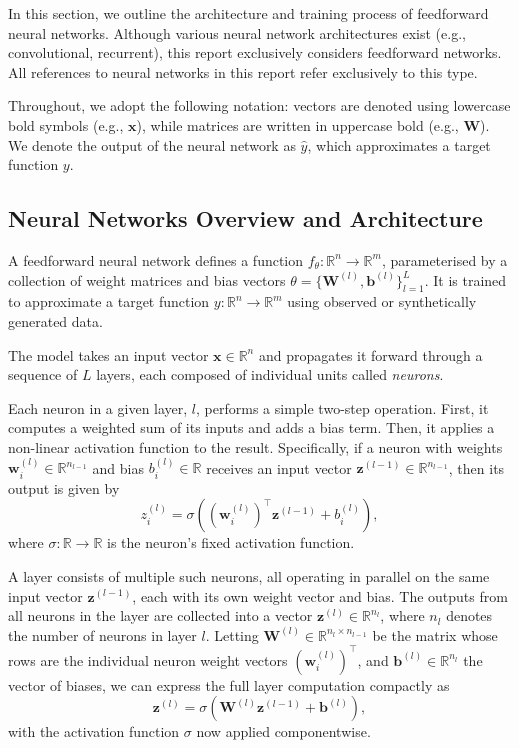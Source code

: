 In this section, we outline the architecture and training process of feedforward neural 
networks. Although various neural network architectures exist (e.g., convolutional, recurrent),
this report exclusively considers feedforward networks. All references to neural networks in this 
report refer exclusively to this type.

Throughout, we adopt the following notation: vectors are denoted using lowercase bold symbols 
(e.g., $\mathbf{x}$), while matrices are written in uppercase bold (e.g., $\mathbf{W}$). We denote 
the output of the neural network as $\hat{y}$, which approximates a target function $y$.

\subsection{Neural Networks Overview and Architecture}

A feedforward neural network defines a function \( f_\theta : \mathbb{R}^n \to \mathbb{R}^m \), 
parameterised by a collection of weight matrices and bias vectors \( \theta = \{ \mathbf{W}^{(l)},
\mathbf{b}^{(l)} \}_{l=1}^L \). It is trained to approximate a target function \( y : \mathbb{R}^n \to 
\mathbb{R}^m \) using observed or synthetically generated data.

The model takes an input vector \( \mathbf{x} \in \mathbb{R}^n \) and propagates it forward through a
sequence of $L$ layers, each composed of individual units called \emph{neurons}. 

Each neuron in a given layer, $l$, performs a simple two-step operation. First, it computes a weighted
sum of its inputs and adds a bias term. Then, it applies a non-linear activation function to the result.
Specifically, if a neuron with weights \( \mathbf{w}^{(l)}_i \in \mathbb{R}^{n_{l-1}} \) and bias 
\( b^{(l)}_i \in \mathbb{R} \) receives an input vector \( \mathbf{z}^{(l-1)} \in \mathbb{R}^{n_{l-1}} \), 
then its output is given by
\[
    z^{(l)}_i = \sigma\left( (\mathbf{w}^{(l)}_i)^\top \mathbf{z}^{(l-1)} + b^{(l)}_i \right),
\]
where \( \sigma: \mathbb{R} \to \mathbb{R} \) is the neuron's fixed activation function.

A layer consists of multiple such neurons, all operating in parallel on the same input vector 
\( \mathbf{z}^{(l-1)} \), each with its own weight vector and bias. The outputs from all neurons in the
layer are collected into a vector \( \mathbf{z}^{(l)} \in \mathbb{R}^{n_l} \), where \( n_l \) denotes 
the number of neurons in layer \( l \). Letting \( \mathbf{W}^{(l)} \in 
\mathbb{R}^{n_l \times n_{l-1}} \) be the matrix whose rows are the individual neuron weight vectors 
\( (\mathbf{w}^{(l)}_i)^\top \), and \( \mathbf{b}^{(l)} \in \mathbb{R}^{n_l} \) the vector of biases, 
we can express the full layer computation compactly as
\[
    \mathbf{z}^{(l)} = \sigma\left( \mathbf{W}^{(l)} \mathbf{z}^{(l-1)} + \mathbf{b}^{(l)} \right),
\]
with the activation function \( \sigma \) now applied componentwise.

